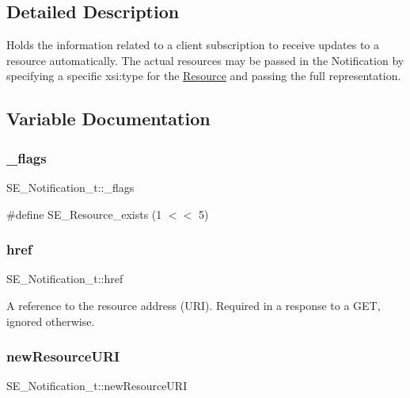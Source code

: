\subsection{Detailed Description}
Holds the information related to a client subscription to receive updates to a resource automatically. The actual resources may be passed in the Notification by specifying a specific xsi\+:type for the \hyperlink{structResource}{Resource} and passing the full representation. 

\subsection{Variable Documentation}
\mbox{\label{group__Notification_ga9cea77779c1429775de7c3bbf1e8c361}} 
\subsubsection{\texorpdfstring{\+\_\+flags}{\_flags}}
{\footnotesize\ttfamily S\+E\+\_\+\+Notification\+\_\+t\+::\+\_\+flags}

\#define S\+E\+\_\+\+Resource\+\_\+exists (1 $<$$<$ 5) \mbox{\label{group__Notification_ga9d9fbe351ee2dd052e844c3dc0cd8222}} 
\subsubsection{\texorpdfstring{href}{href}}
{\footnotesize\ttfamily S\+E\+\_\+\+Notification\+\_\+t\+::href}

A reference to the resource address (U\+RI). Required in a response to a G\+ET, ignored otherwise. \mbox{\label{group__Notification_ga9dab2eb1085b330946a147430a8a9c3e}} 
\subsubsection{\texorpdfstring{new\+Resource\+U\+RI}{newResourceURI}}
{\footnotesize\ttfamily S\+E\+\_\+\+Notification\+\_\+t\+::new\+Resource\+U\+RI}

